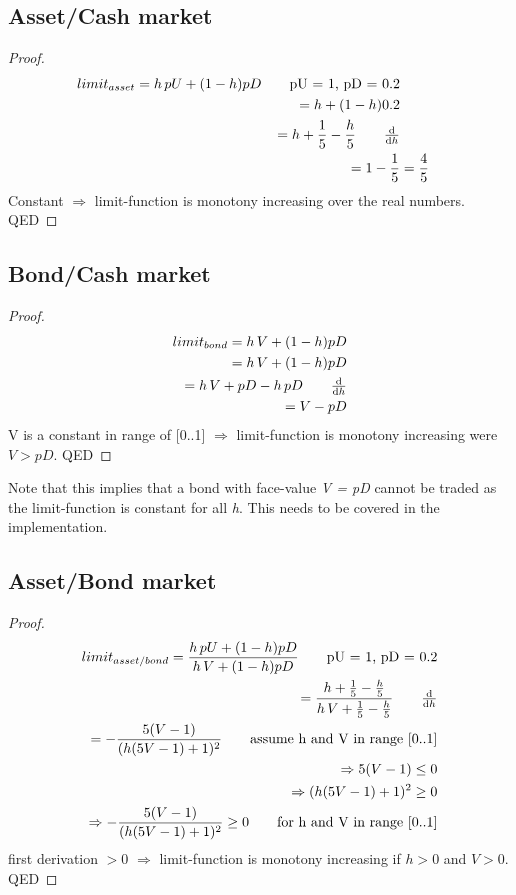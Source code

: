 \documentclass[Bachelorarbeit.tex]{subfiles}
\begin{document}
\subsection{Asset/Cash market}
\begin{proof}
\begin{align*}
	limit_{asset} = h \, pU + (1-h) pD		\tag*{pU = 1, pD = 0.2}
	\\ = h + (1 - h)0.2
	\\ = h + \frac{1}{5} - \frac{h}{5}		\tag*{$\frac{\mathrm d}{\mathrm d h}$}
	\\ = 1 - \frac{1}{5}
		&= \frac{4}{5}
\end{align*}
Constant $\Rightarrow$ limit-function is monotony increasing over the real numbers. QED
\end{proof}

\subsection{Bond/Cash market}
\begin{proof}
\begin{align*}
	limit_{bond} = h \, V + (1-h) pD			
	\\ = h \, V + (1 - h)pD
	\\ = h \, V + pD - h\,pD		\tag*{$\frac{\mathrm d}{\mathrm d h}$}
	\\ = V - pD
\end{align*}
V is a constant in range of [0..1] $\Rightarrow$ limit-function is monotony increasing were $V > pD$. QED
\end{proof}

Note that this implies that a bond with face-value \textit{V = pD} cannot be traded as the limit-function is constant for all \textit{h}. This needs to be covered in the implementation.

\subsection{Asset/Bond market}
\begin{proof}
\begin{align*}
	limit_{asset/bond} = \frac{h \, pU + (1-h) pD}{h \, V + (1-h) pD} 				\tag*{pU = 1, pD = 0.2}
	\\ = \frac{h + \frac{1}{5} - \frac{h}{5}}{h \, V + \frac{1}{5} - \frac{h}{5}}	\tag*{$\frac{\mathrm d}{\mathrm d h}$}
	\\ = - \frac{5(V-1)}{(h(5V-1)+1)^2}									\tag*{assume h and V in range [0..1]}
	\\ \Rightarrow 5(V-1) \leq 0
	\\ \Rightarrow (h(5V-1)+1)^2 \geq 0
	\\ \Rightarrow - \frac{5(V-1)}{(h(5V-1)+1)^2} \geq 0 			\tag*{for h and V in range [0..1]}
\end{align*}
first derivation $> 0$ $\Rightarrow$ limit-function is monotony increasing if $h > 0$ and $V > 0$. QED
\end{proof}
\end{document}
